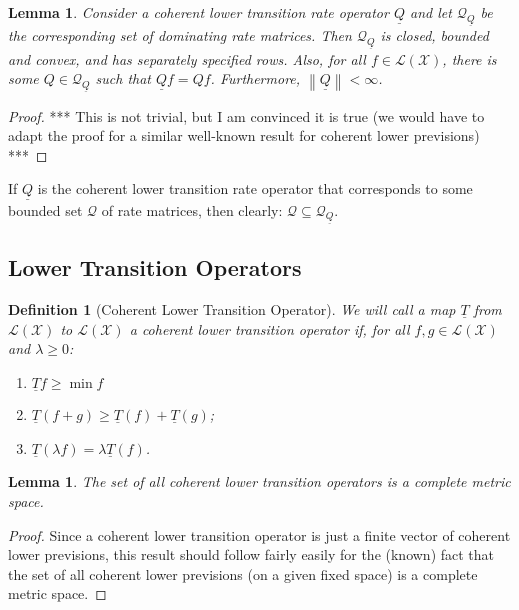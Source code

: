 \documentclass[10pt]{paper}
\newtheorem{lemma}[theorem]{Lemma}
\newtheorem{definition}{Definition}
\newcommand{\states}{\mathcal{X}}
\newcommand{\lt}{\underline{T}}
\newcommand{\gambles}{\mathcal{L}}
\newcommand{\gamblesX}{\gambles(\states)}
\newcommand{\rateset}{\mathcal{Q}}
\newcommand{\lrate}{\underline{Q}}
\newcommand{\norm}[1]{\left\lVert #1 \right\rVert}
\begin{document}
\begin{lemma}
Consider a coherent lower transition rate operator $\lrate$ and let $\rateset_{\lrate}$ be the corresponding set of dominating rate matrices. Then $\rateset_{\lrate}$ is closed, bounded and convex, and has separately specified rows. Also, for all $f\in\gamblesX$, there is some $Q\in\rateset_{\lrate}$ such that $\lrate f=Qf$. Furthermore, $\norm{\lrate}<\infty$.
\end{lemma}
\begin{proof}
*** This is not trivial, but I am convinced it is true (we would have to adapt the proof for a similar well-known result for coherent lower previsions) ***
\end{proof}

\noindent
If $\lrate$ is the coherent lower transition rate operator that corresponds to some bounded set $\rateset$ of rate matrices, then clearly: $\rateset\subseteq\rateset_{\lrate}$.

\subsection{Lower Transition Operators}

\begin{definition}[Coherent Lower Transition Operator]\label{def:coh_low_trans}
We will call a map $\lt$ from $\gamblesX$ to $\gamblesX$ a \emph{coherent lower transition operator} if, for all $f,g\in\gamblesX$ and $\lambda\geq0$:

\vspace{5pt}
\begin{enumerate}[label=C\arabic*:]
\item
$\lt f\geq\min f$
\item
$\lt(f+g)\geq\lt(f)+\lt(g)$;
\item
$\lt(\lambda f)=\lambda\lt(f)$.
\end{enumerate}
\vspace{5pt}
\end{definition}

\begin{lemma}\label{lemma:completemetricspace}
The set of all coherent lower transition operators is a complete metric space.
\end{lemma}
\begin{proof}
Since a coherent lower transition operator is just a finite vector of coherent lower previsions, this result should follow fairly easily for the (known) fact that the set of all coherent lower previsions (on a given fixed space) is a complete metric space.
\end{proof}
\end{document}
